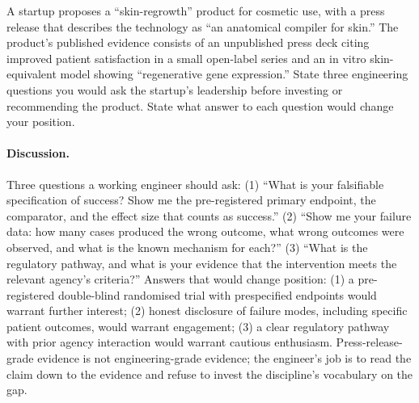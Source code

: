\begin{exercise}
A startup proposes a ``skin-regrowth'' product for cosmetic use, with
a press release that describes the technology as ``an anatomical
compiler for skin.'' The product's published evidence consists of an
unpublished press deck citing improved patient satisfaction in a small
open-label series and an in vitro skin-equivalent model showing
``regenerative gene expression.'' State three engineering questions
you would ask the startup's leadership before investing or
recommending the product. State what answer to each question would
change your position.

\paragraph{Discussion.}
Three questions a working engineer should ask: (1) ``What is your
falsifiable specification of success? Show me the pre-registered
primary endpoint, the comparator, and the effect size that counts as
success.'' (2) ``Show me your failure data: how many cases produced
the wrong outcome, what wrong outcomes were observed, and what is the
known mechanism for each?'' (3) ``What is the regulatory pathway, and
what is your evidence that the intervention meets the relevant
agency's criteria?'' Answers that would change position: (1) a
pre-registered double-blind randomised trial with prespecified
endpoints would warrant further interest; (2) honest disclosure of
failure modes, including specific patient outcomes, would warrant
engagement; (3) a clear regulatory pathway with prior agency
interaction would warrant cautious enthusiasm. Press-release-grade
evidence is not engineering-grade evidence; the engineer's job is to
read the claim down to the evidence and refuse to invest the
discipline's vocabulary on the gap.
\end{exercise}

